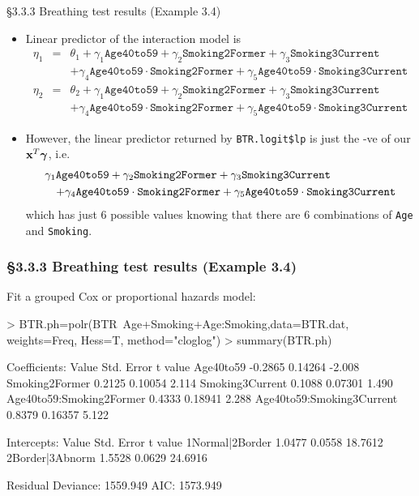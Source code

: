 \documentclass{beamer}
\begin{document}
\begin{frame}{\S3.3.3 Breathing test results  (Example 3.4)}
\begin{itemize}
\item
Linear predictor of the interaction model is {\scriptsize
\begin{eqnarray*}
\eta_1 &=& \theta_1
+ \gamma_1\texttt{Age40to59}+\gamma_2\texttt{Smoking2Former}+\gamma_3\texttt{Smoking3Current} \\
& & + \gamma_4\texttt{Age40to59}\cdot \texttt{Smoking2Former}
+ \gamma_5\texttt{Age40to59}\cdot \texttt{Smoking3Current} \\
\eta_2&=& \theta_2
+ \gamma_1\texttt{Age40to59}+\gamma_2\texttt{Smoking2Former}+\gamma_3\texttt{Smoking3Current} \\
& & + \gamma_4\texttt{Age40to59}\cdot \texttt{Smoking2Former}
+ \gamma_5\texttt{Age40to59}\cdot \texttt{Smoking3Current} 
\end{eqnarray*}}
\item
However, the linear predictor returned by \texttt{BTR.logit\$lp} is just the -ve of our $\textbf{x}^T\mbox{\boldmath $\gamma$}$, i.e.
{\scriptsize
\begin{eqnarray*}
\lefteqn{ \gamma_1\texttt{Age40to59}+\gamma_2\texttt{Smoking2Former}+\gamma_3\texttt{Smoking3Current}} & \\
& &  + \gamma_4\texttt{Age40to59}\cdot \texttt{Smoking2Former}
+ \gamma_5\texttt{Age40to59}\cdot \texttt{Smoking3Current}
\end{eqnarray*}}
which has just 6 possible values knowing that there are 6 combinations of \texttt{Age} and \texttt{Smoking}.


\end{itemize}
\end{frame}


\begin{frame}[fragile] \frametitle{\S3.3.3 Breathing test results  (Example 3.4)}
Fit a grouped Cox or proportional hazards model:
\begin{scriptsize}
\begin{Schunk}
\begin{Sinput}
> BTR.ph=polr(BTR~Age+Smoking+Age:Smoking,data=BTR.dat, weights=Freq, 
                      Hess=T, method="cloglog")
> summary(BTR.ph)
\end{Sinput} 
\begin{Soutput}
Coefficients:
                            Value Std. Error t value
Age40to59                 -0.2865    0.14264  -2.008
Smoking2Former             0.2125    0.10054   2.114
Smoking3Current            0.1088    0.07301   1.490
Age40to59:Smoking2Former   0.4333    0.18941   2.288
Age40to59:Smoking3Current  0.8379    0.16357   5.122

Intercepts:
                Value   Std. Error t value
1Normal|2Border  1.0477  0.0558    18.7612
2Border|3Abnorm  1.5528  0.0629    24.6916

Residual Deviance: 1559.949 
AIC: 1573.949 
\end{Soutput}
\end{Schunk}
\end{scriptsize}
\end{frame}
\end{document}
